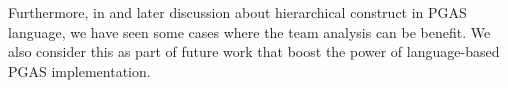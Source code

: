 Furthermore, in\cite{upc-teams} and later discussion about hierarchical construct in PGAS language, we have seen some cases where the team analysis can be benefit. We also consider this as part of future work that boost the power of language-based PGAS implementation. 
%
%
%
%
%
%
%
%
%
%
%
%
%
%
